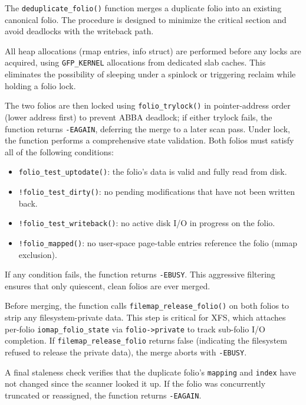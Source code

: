 \documentclass[conference]{IEEEtran}
\begin{document}
The \texttt{deduplicate\_folio()} function merges a duplicate folio into an existing canonical folio. The procedure is designed to minimize the critical section and avoid deadlocks with the writeback path.

All heap allocations (rmap entries, info struct) are performed before any locks are acquired, using \texttt{GFP\_KERNEL} allocations from dedicated slab caches. This eliminates the possibility of sleeping under a spinlock or triggering reclaim while holding a folio lock.

The two folios are then locked using \texttt{folio\_trylock()} in pointer-address order (lower address first) to prevent ABBA deadlock; if either trylock fails, the function returns \texttt{-EAGAIN}, deferring the merge to a later scan pass. Under lock, the function performs a comprehensive state validation. Both folios must satisfy all of the following conditions:

\begin{itemize}
    \item \texttt{folio\_test\_uptodate()}: the folio's data is valid and fully read from disk.
    \item \texttt{!folio\_test\_dirty()}: no pending modifications that have not been written back.
    \item \texttt{!folio\_test\_writeback()}: no active disk I/O in progress on the folio.
    \item \texttt{!folio\_mapped()}: no user-space page-table entries reference the folio (mmap exclusion).
\end{itemize}

If any condition fails, the function returns \texttt{-EBUSY}. This aggressive filtering ensures that only quiescent, clean folios are ever merged.

Before merging, the function calls \texttt{filemap\_release\_folio()} on both folios to strip any filesystem-private data. This step is critical for XFS, which attaches per-folio \texttt{iomap\_folio\_state} via \texttt{folio->private} to track sub-folio I/O completion. If \texttt{filemap\_release\_folio} returns false (indicating the filesystem refused to release the private data), the merge aborts with \texttt{-EBUSY}.

A final staleness check verifies that the duplicate folio's \texttt{mapping} and \texttt{index} have not changed since the scanner looked it up. If the folio was concurrently truncated or reassigned, the function returns \texttt{-EAGAIN}.
\end{document}
